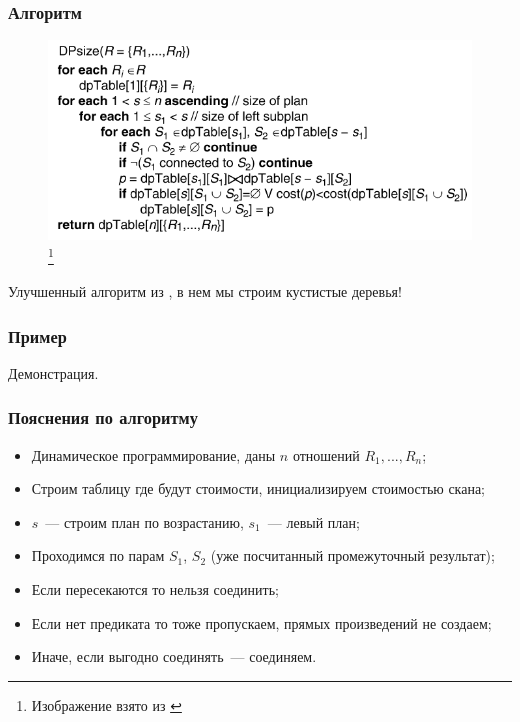 \documentclass{beamer}
\begin{document}
\begin{frame}
\frametitle{Алгоритм}

\begin{figure}[htb]
\includegraphics[width=\textwidth,height=0.59\textheight,keepaspectratio]{algorithm.png} 
\footnote{\tiny{Изображение взято из \cite{Neumann2009}}}
\end{figure}

Улучшенный алгоритм из \cite{Selinger1979}, в нем мы строим \alert{кустистые деревья}!

\end{frame}

\begin{frame}
	\frametitle{Пример}

Демонстрация.
\end{frame}

\begin{frame}
\frametitle{Пояснения по алгоритму}

\begin{itemize}
  \item Динамическое программирование, даны $n$ отношений $R_1, ..., R_n$;
  \item Строим таблицу где будут стоимости, инициализируем стоимостью скана;
  \item $s$~--- строим план по возрастанию, $s_1$~--- левый план;
  \item Проходимся по парам $S_1$, $S_2$ (уже посчитанный промежуточный результат);
  \item Если пересекаются то нельзя соединить;
  \item Если нет предиката то тоже пропускаем, прямых произведений не создаем;
  \item Иначе, если выгодно соединять~--- соединяем.
\end{itemize}

\end{frame}
\end{document}

